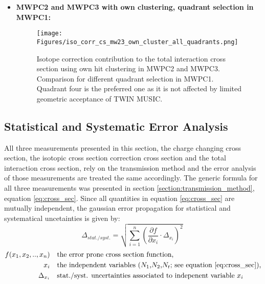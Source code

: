 \begin{itemize}
\item \textbf{MWPC2 and MWPC3 with own clustering, quadrant selection in MWPC1:}\newline
\begin{figure}[h!]
    \centering
    \texttt{[image: Figures/iso\_corr\_cs\_mw23\_own\_cluster\_all\_quadrants.png]}
    \caption{
	Isotope correction contribution to the total interaction cross section using own  hit clustering in MWPC2 and MWPC3. Comparison for different quadrant selection in MWPC1. Quadrant four is the preferred one as it is not affected by limited geometric acceptance of TWIN MUSIC.
     }
    \label{fig:iso_corr_quadrants_own_cluster}
\end{figure}

\end{itemize}

\newpage
\subsection{Statistical and Systematic Error Analysis}
All three measurements presented in this section, the charge changing cross section, the isotopic cross section correction cross section and the total interaction cross section, rely on the transmission method and the error analysis of those measurements are treated the same accordingly. The generic formula for all three measurements was presented in section \ref{section:transmission_method}, equation \ref{eq:cross_sec}.\newline
Since all quantities in equation \ref{eq:cross_sec} are mutually independent, the gaussian error propagation for statistical and systematical uncetainties is given by:
\begin{equation}
\Delta_{stat./syst.}  = \sqrt{\sum_{i=1}^n \left( \frac{\partial f}{\partial x_i} \cdot \Delta_{x_i} \right)^2 }\
\end{equation}
\begin{align*}
	f(x_1,x_2,..,x_n) &\quad \text{the error prone cross section function,} \\
	x_i  &\quad \text{the independent variables ($N_1$,$N_2$,$N_t$; see equation \ref{eq:cross_sec}),} \\
	\Delta_{x_i} &\quad \text{stat./syst. uncertainties associated to indepenent variable $x_i$}
\end{align*}



